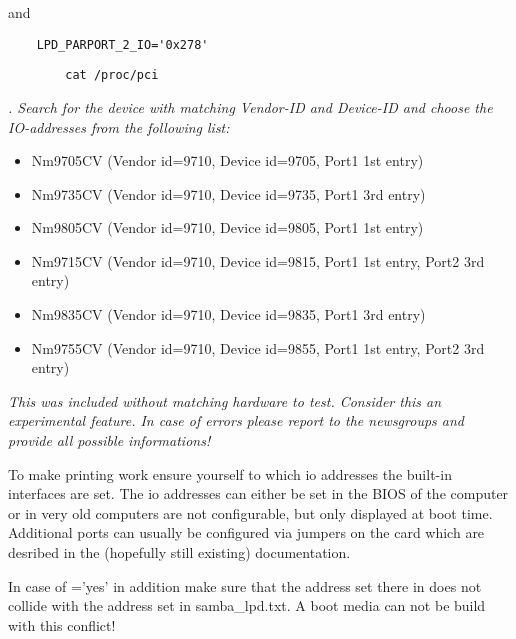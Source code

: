 \begin{description}
  and

\begin{example}
\begin{verbatim}
    LPD_PARPORT_2_IO='0x278'
\end{verbatim}
\end{example}


\begin{example}
\begin{verbatim}
        cat /proc/pci
\end{verbatim}
\end{example}
  \emph{. Search for the device with matching Vendor-ID and Device-ID and choose the
  IO-addresses from the following list:}

      \begin{itemize}
      \item Nm9705CV  (Vendor id=9710, Device id=9705, Port1 1st entry)
      \item Nm9735CV  (Vendor id=9710, Device id=9735, Port1 3rd entry)
      \item Nm9805CV  (Vendor id=9710, Device id=9805, Port1 1st entry)
      \item Nm9715CV  (Vendor id=9710, Device id=9815, Port1 1st entry, Port2 3rd entry)
      \item Nm9835CV  (Vendor id=9710, Device id=9835, Port1 3rd entry)
      \item Nm9755CV  (Vendor id=9710, Device id=9855, Port1 1st entry, Port2 3rd entry)
      \end{itemize}

  \emph{This was included without matching hardware to test. Consider this an
  experimental feature. In case of errors please report to the newsgroups
  and provide all possible informations!}

  To make printing work ensure yourself to which io addresses the built-in
  interfaces are set. The io addresses can either be set in the BIOS of the
  computer or in very old computers are not configurable, but only displayed
  at boot time. Additional ports can usually be configured via jumpers on the
  card which are desribed in the (hopefully still existing) documentation.

  In case of ='yes' in addition make sure that the address
  set there in  does not collide with the address set
  in samba\_lpd.txt. A boot media can not be build with this conflict!


\end{description}
